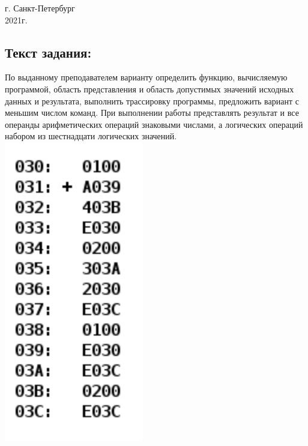 \documentclass[12pt,onecolumn]{article}
\begin{document}
\vspace{10cm}
\begin{center}
    г. Санкт-Петербург\\
    2021г.
\end{center}
\newpage
\tableofcontents
\newpage
\begin{flushleft}
\section{Текст задания:}
\hfill \break
По выданному преподавателем варианту определить функцию, вычисляемую программой, область представления и область допустимых значений исходных данных и результата, выполнить трассировку программы, предложить вариант с меньшим числом команд. При выполнении работы представлять результат и все операнды арифметических операций знаковыми числами, а логических операций набором из шестнадцати логических значений.\\
\includegraphics[]{Task.png}

\end{flushleft}
\end{document}
